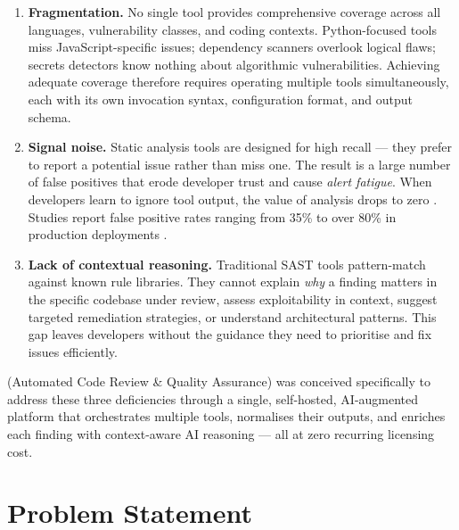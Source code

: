 \begin{enumerate}
  \item \textbf{Fragmentation.} No single tool provides comprehensive coverage across all languages, vulnerability classes, and coding contexts. Python-focused tools miss JavaScript-specific issues; dependency scanners overlook logical flaws; secrets detectors know nothing about algorithmic vulnerabilities. Achieving adequate coverage therefore requires operating multiple tools simultaneously, each with its own invocation syntax, configuration format, and output schema.

  \item \textbf{Signal noise.} Static analysis tools are designed for high recall --- they prefer to report a potential issue rather than miss one. The result is a large number of false positives that erode developer trust and cause \textit{alert fatigue}. When developers learn to ignore tool output, the value of analysis drops to zero \cite{johnson2013dont}. Studies report false positive rates ranging from 35\% to over 80\% in production deployments \cite{muske2016survey}.

  \item \textbf{Lack of contextual reasoning.} Traditional SAST tools pattern-match against known rule libraries. They cannot explain \textit{why} a finding matters in the specific codebase under review, assess exploitability in context, suggest targeted remediation strategies, or understand architectural patterns. This gap leaves developers without the guidance they need to prioritise and fix issues efficiently.
\end{enumerate}

\ACRQA{} (Automated Code Review \& Quality Assurance) was conceived specifically to address these three deficiencies through a single, self-hosted, AI-augmented platform that orchestrates multiple tools, normalises their outputs, and enriches each finding with context-aware AI reasoning --- all at zero recurring licensing cost.

\section{Problem Statement}
\label{sec:problem}

